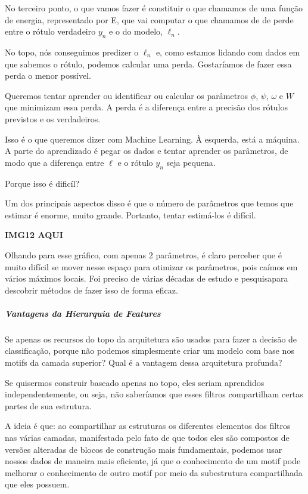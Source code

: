 \documentclass[11pt, a4paper]{article}
\begin{document}
No terceiro ponto, o que vamos fazer é constituir o que chamamos de uma função de energia, representado por E, que vai computar o que chamamos de de perde entre o rótulo verdadeiro $y_n$ e o do modelo, $\ell _n$.

No topo, nós conseguimos predizer o $\ell _n$ e, como estamos lidando com dados em que sabemos o rótulo, podemos calcular uma perda. Gostaríamos de fazer essa perda o menor possível.

Queremos tentar aprender ou identificar ou calcular os parâmetros $\phi$, $\psi$, $\omega$ e $W$ que minimizam essa perda. A perda é a diferença entre a precisão dos rótulos previstos e os verdadeiros.

Isso é o que queremos dizer com Machine Learning. À esquerda, está a máquina. A parte do aprendizado é pegar os dados e tentar aprender os parâmetros, de modo que a diferença entre $\ell$ e o rótulo $y_n$ seja pequena.

Porque isso é dificíl?

Um dos principais aspectos disso é que o número de parâmetros que temos que estimar é enorme, muito grande. Portanto, tentar estimá-los é difícil.

\textbf{IMG12 AQUI}

Olhando para esse gráfico, com apenas 2 parâmetros, é claro perceber que é muito difícil se mover nesse espaço para otimizar os parâmetros, pois caímos em vários máximos locais. Foi preciso de várias décadas de estudo e pesquisapara descobrir métodos de fazer isso de forma eficaz.

\subparagraph{Vantagens da Hierarquia de Features}

Se apenas os recursos do topo da arquitetura são usados para fazer a decisão de classificação, porque não podemos simplesmente criar um modelo com base nos motifs da camada superior? Qual é a vantagem dessa arquitetura profunda?

Se quisermos construir baseado apenas no topo, eles seriam aprendidos independentemente, ou seja, não saberíamos que esses filtros compartilham certas partes de sua estrutura. 

A ideia é que: ao compartilhar as estruturas os diferentes elementos dos filtros nas várias camadas, manifestada pelo fato de que todos eles são compostos de versões alteradas de blocos de construção mais fundamentais, podemos usar nossos dados de maneira mais eficiente, já que o conhecimento  de um motif pode melhorar o conhecimento de outro motif por meio da subestrutura compartilhada que eles possuem.
\end{document}
